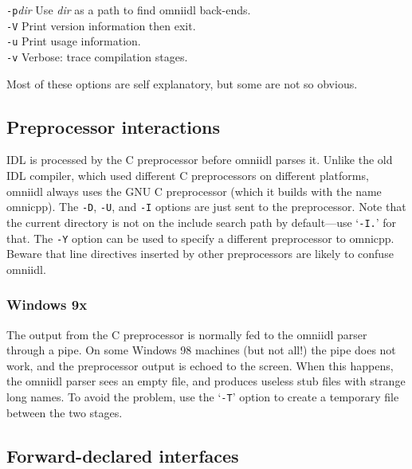 \documentclass[11pt,twoside,a4paper]{book}
\newcommand{\cmdline}[1]{\texttt{#1}}
\begin{document}
\begin{tabbing}
\cmdline{-p}\textit{dir}
     \> Use \textit{dir} as a path to find omniidl back-ends.\\

\cmdline{-V}
     \> Print version information then exit.\\

\cmdline{-u}
     \> Print usage information.\\

\cmdline{-v}
     \> Verbose: trace compilation stages.\\

\end{tabbing}

\noindent Most of these options are self explanatory, but some are not
so obvious.

\subsection{Preprocessor interactions}

IDL is processed by the C preprocessor before omniidl parses it.
Unlike the old IDL compiler, which used different C preprocessors on
different platforms, omniidl always uses the GNU C preprocessor (which
it builds with the name omnicpp). The \cmdline{-D}, \cmdline{-U}, and
\cmdline{-I} options are just sent to the preprocessor. Note that the
current directory is not on the include search path by default---use
`\cmdline{-I.}' for that. The \cmdline{-Y} option can be used to
specify a different preprocessor to omnicpp. Beware that line
directives inserted by other preprocessors are likely to confuse
omniidl.

\subsubsection{Windows 9x}

The output from the C preprocessor is normally fed to the omniidl
parser through a pipe. On some Windows 98 machines (but not all!)  the
pipe does not work, and the preprocessor output is echoed to the
screen. When this happens, the omniidl parser sees an empty file, and
produces useless stub files with strange long names. To avoid the
problem, use the `\cmdline{-T}' option to create a temporary file
between the two stages.


\subsection{Forward-declared interfaces}
\end{document}
